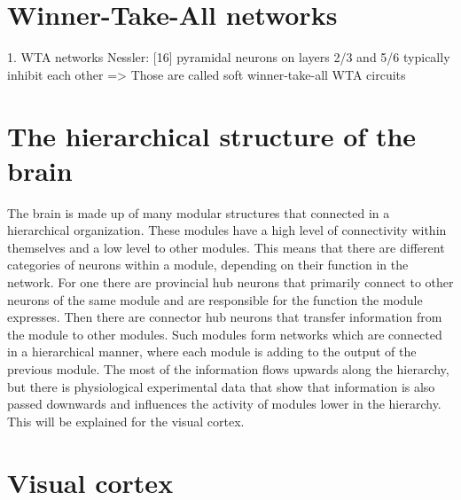 \section{Winner-Take-All networks}


1. WTA networks
Nessler: [16] pyramidal neurons on layers 2/3 and 5/6 typically inhibit each other => Those are called soft winner-take-all WTA circuits

\section{The hierarchical structure of the brain}

The brain is made up of many modular structures that connected in a hierarchical organization. These modules have a high level of connectivity within themselves and a low level to other modules. This means that there are different categories of neurons within a module, depending on their function in the network. For one there are provincial hub neurons that primarily connect to other neurons of the same module and are responsible for the function the module expresses. Then there are connector hub neurons that transfer information from the module to other modules. Such modules form networks which are connected in a hierarchical manner, where each module is adding to the output of the previous module. \citep{hierarchicalBrain}
The most of the information flows upwards along the hierarchy, but there is physiological experimental data that show that information is also passed downwards and influences the activity of modules lower in the hierarchy. This will be explained for the visual cortex.

\section{Visual cortex}

